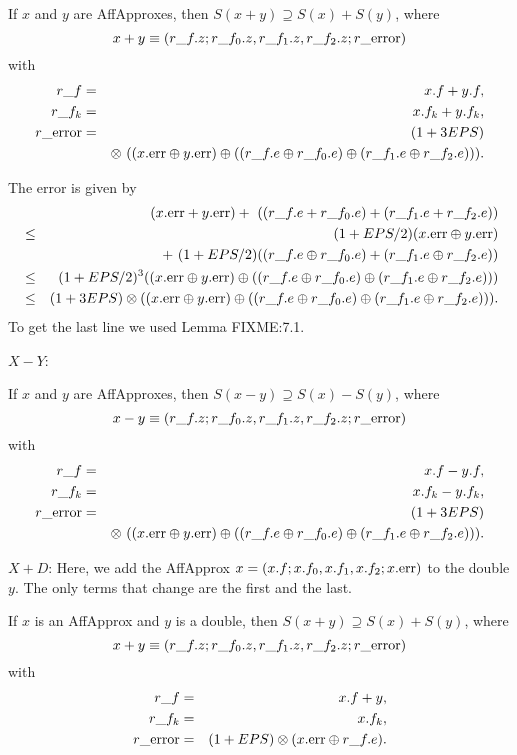  If $x$ and $y$ are 
{\rm AffApproxes, }
then $S(x + y) \supseteq S(x) + S(y)${\rm ,} where
$$x + y \equiv (r\_f.z; r\_f_0.z, r\_f_1.z, r\_f_2.z; r\_{\rm error})$$
with
\begin{eqnarray*}
r\_f &=& x.f + y.f,\\
r\_f_k &=& x.f_k + y.f_k,\\
r\_{\rm error}& =& (1 + 3EPS)\\
&&\otimes\ ((x.{\rm err} \oplus y.{\rm err}) \oplus ((r\_f.e \oplus
r\_f_0.e) \oplus (r\_f_1.e \oplus r\_f_2.e))).
\end{eqnarray*}
\endproclaim

The error is given by 
\begin{eqnarray*}
&&\hskip-24pt (x.{\rm err} + y.{\rm err})  +\ ((r\_f.e + r\_f_0.e) + (r\_f_1.e + r\_f_2.e))\\
&\le& (1+EPS/2) (x.{\rm err} \oplus
y.{\rm err}) \\
&&+\ (1+EPS/2)((r\_f.e \oplus r\_f_0.e) + (r\_f_1.e \oplus r\_f_2.e))\\
&\le& (1+EPS/2)^3 ((x.{\rm err} \oplus
y.{\rm err}) \oplus ((r\_f.e \oplus r\_f_0.e) \oplus (r\_f_1.e \oplus r\_f_2.e)))\\
&\le& (1 + 3EPS) \otimes ((x.{\rm
err} \oplus y.{\rm err}) \oplus ((r\_f.e \oplus r\_f_0.e) \oplus (r\_f_1.e \oplus r\_f_2.e))).
\end{eqnarray*}
 To get the last line
we used Lemma FIXME:7.1. \enddemo

$X - Y$:

 If $x$ and $y$ are {\rm AffApproxes,} then $S(x - y) \supseteq S(x) - S(y)${\rm ,}
 where
$$x - y \equiv (r\_f.z; r\_f_0.z, r\_f_1.z, r\_f_2.z; r\_{\rm error})$$
with
\begin{eqnarray*}
r\_f& =& x.f - y.f,\\
r\_f_k &= &x.f_k - y.f_k,\\
r\_{\rm error} &=& (1 + 3EPS)\\
&& \otimes\ ((x.{\rm err} \oplus y.{\rm err}) \oplus ((r\_f.e
\oplus r\_f_0.e) \oplus (r\_f_1.e \oplus r\_f_2.e))).
\end{eqnarray*}
\endproclaim

$X + D$: 
Here, we add the AffApprox $x = (x.f; x.f_0,x.f_1,x.f_2; x.{\rm err})$  to the double $y$.  The only terms that change are the first and the last.

\hskip-8pt If $x$ is an 
{\rm AffApprox}  and $y$ is a double{\rm ,} 
then $S(x + y) \supseteq S(x) + S(y)${\rm ,} where
$$x + y \equiv (r\_f.z; r\_f_0.z, r\_f_1.z, r\_f_2.z; r\_{\rm error})$$
with
\begin{eqnarray*}
r\_f& =& x.f + y,\\
r\_f_k &=& x.f_k,\\
r\_{\rm error}& = &(1 + EPS) \otimes (x.{\rm err} \oplus r\_f.e).\end{eqnarray*}
\endproclaim


